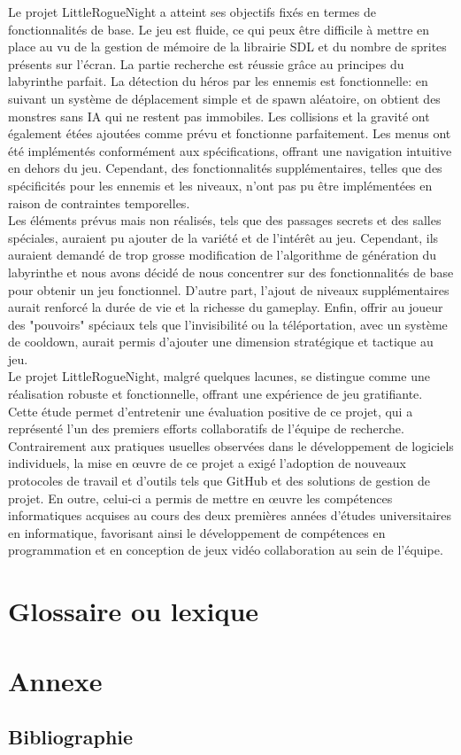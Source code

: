 \documentclass[10pt]{article}
\begin{document}
Le projet LittleRogueNight a atteint ses objectifs fixés en termes de fonctionnalités de base. Le jeu est fluide, ce qui peux être difficile à mettre en place au vu de la gestion de mémoire de la librairie SDL et du nombre de sprites présents sur l'écran. La partie recherche est réussie grâce au principes du labyrinthe parfait. La détection du héros par les ennemis est fonctionnelle: en suivant un système de déplacement simple et de spawn aléatoire, on obtient des monstres sans IA qui ne restent pas immobiles. Les collisions et la gravité ont également étées ajoutées comme prévu et fonctionne parfaitement. Les menus ont été implémentés conformément aux spécifications, offrant une navigation intuitive en dehors du jeu. Cependant, des fonctionnalités supplémentaires, telles que des spécificités pour les ennemis et les niveaux, n'ont pas pu être implémentées en raison de contraintes temporelles.\\

Les éléments prévus mais non réalisés, tels que des passages secrets et des salles spéciales, auraient pu ajouter de la variété et de l'intérêt au jeu. Cependant, ils auraient demandé de trop grosse modification de l'algorithme de génération du labyrinthe et nous avons décidé de nous concentrer sur des fonctionnalités de base pour obtenir un jeu fonctionnel. D'autre part, l'ajout de niveaux supplémentaires aurait renforcé la durée de vie et la richesse du gameplay. Enfin, offrir au joueur des "pouvoirs" spéciaux tels que l'invisibilité ou la téléportation, avec un système de cooldown, aurait permis d'ajouter une dimension stratégique et tactique au jeu.\\

Le projet LittleRogueNight, malgré quelques lacunes, se distingue comme une réalisation robuste et fonctionnelle, offrant une expérience de jeu gratifiante. Cette étude permet d'entretenir une évaluation positive de ce projet, qui a représenté l'un des premiers efforts collaboratifs de l'équipe de recherche. Contrairement aux pratiques usuelles observées dans le développement de logiciels individuels, la mise en œuvre de ce projet a exigé l'adoption de nouveaux protocoles de travail et d'outils tels que GitHub et des solutions de gestion de projet. En outre, celui-ci a permis de mettre en œuvre les compétences informatiques acquises au cours des deux premières années d'études universitaires en informatique, favorisant ainsi le développement de compétences en programmation et en conception de jeux vidéo collaboration au sein de l'équipe.\\
\clearpage

\section{Glossaire ou lexique}

\section{Annexe}
   \subsection{Bibliographie}
   \printglossary
\end{document}
